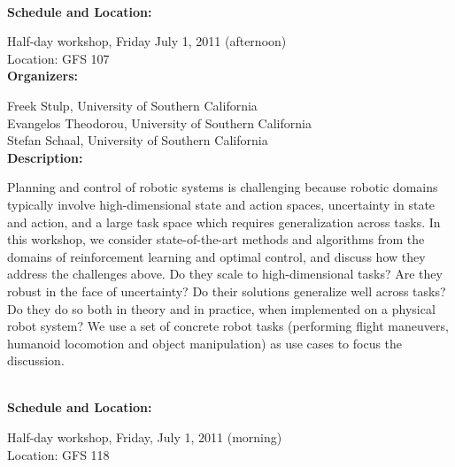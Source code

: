 {%
\\[5mm]

{\bf  Schedule and Location:}

Half-day workshop, Friday July 1, 2011 (afternoon)\\
Location: GFS 107 \\[4mm]

{\bf  Organizers:}


Freek Stulp,  University of Southern California\\
Evangelos Theodorou, University of Southern California\\
 Stefan Schaal, University of Southern California\\[4mm]

{\bf Description: }

Planning and control of robotic systems is challenging because robotic domains typically involve high-dimensional state and action spaces, uncertainty in state and action, and a large task space which requires generalization across tasks. In this workshop, we consider state-of-the-art methods and algorithms from the domains of reinforcement learning and optimal control, and discuss how they address the challenges above. Do they scale to high-dimensional tasks? Are they robust in the face of uncertainty? Do their solutions generalize well across tasks? Do they do so both in theory and in practice, when implemented on a physical robot system? We use a set of concrete robot tasks (performing flight maneuvers, humanoid locomotion and object manipulation) as use cases to focus the discussion.





\\[5mm]

{\bf  Schedule and Location:}

Half-day workshop, Friday, July 1, 2011 (morning)\\
Location: GFS 118\\[4mm]

}
